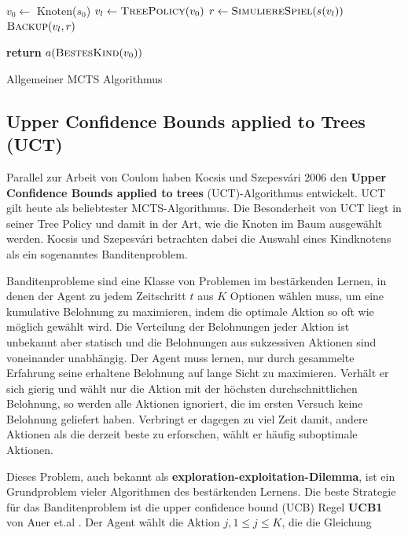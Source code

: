 \begin{algorithm}[H]
\begin{algorithmic}
	\State $v_0\gets$ Knoten($s_0$)
		\State $v_l\gets \Call{TreePolicy}{v_0}$
		\State $r\gets \Call{SimuliereSpiel}{s(v_l)}$
		\State $\Call{Backup}{v_l, r}$
	\EndWhile

\State \textbf{return} $a(\Call{BestesKind}{v_0})$
\EndFunction
\end{algorithmic}
\caption{Allgemeiner MCTS Algorithmus\footnotemark}
\label{algo:mcts}
\end{algorithm}

\subsection{Upper Confidence Bounds applied to Trees (UCT)}

Parallel zur Arbeit von Coulom haben Kocsis und Szepesv\'{a}ri 2006 den \textbf{Upper Confidence Bounds applied to trees} (UCT)-Algorithmus \autocite{kocsisBanditBasedMonteCarlo2006} entwickelt. UCT gilt heute als beliebtester MCTS-Algorithmus. Die Besonderheit von UCT liegt in seiner Tree Policy und damit in der Art, wie die Knoten im Baum ausgewählt werden. Kocsis und Szepesv\'{a}ri betrachten dabei die Auswahl eines Kindknotens als ein sogenanntes Banditenproblem. \autocite[\ppno~25\psqq]{suttonReinforcementLearningIntroduction2018}

\bigskip
Banditenprobleme sind eine Klasse von Problemen im bestärkenden Lernen, in denen der Agent zu jedem Zeitschritt $t$ aus $K$ Optionen wählen muss, um eine kumulative Belohnung zu maximieren, indem die optimale Aktion so oft wie möglich gewählt wird. Die Verteilung der Belohnungen jeder Aktion ist unbekannt aber statisch und die Belohnungen aus sukzessiven Aktionen sind voneinander unabhängig. Der Agent muss lernen, nur durch gesammelte Erfahrung seine erhaltene Belohnung auf lange Sicht zu maximieren. Verhält er sich gierig und wählt nur die Aktion mit der höchsten durchschnittlichen Belohnung, so werden alle Aktionen ignoriert, die im ersten Versuch keine Belohnung geliefert haben. Verbringt er dagegen zu viel Zeit damit, andere Aktionen als die derzeit beste zu erforschen, wählt er häufig suboptimale Aktionen. 

Dieses Problem, auch bekannt als \textbf{exploration-exploitation-Dilemma}, ist ein Grundproblem vieler Algorithmen des bestärkenden Lernens. Die beste Strategie für das Banditenproblem ist die upper confidence bound (UCB) Regel \textbf{UCB1} von Auer et.al \autocite[\ppno~237]{auerFinitetimeAnalysisMultiarmed2002}. Der Agent wählt die Aktion $j, 1 \le j \le K$, die die Gleichung

